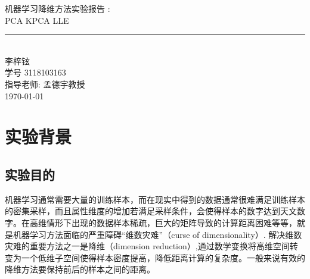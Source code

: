 \documentclass[UTF8]{ctexart}
\newcommand{\labtitle}{PCA KPCA LLE}
\newcommand{\authorname}{李梓铉}
\newcommand{\professor}{孟德宇教授}
\newcommand{\classno}{3118103163}
\begin{document}


\begin{titlepage}
\begin{center}
{\LARGE \textsc{机器学习降维方法实验报告 :} \\ \vspace{4pt}}
{\Large \textsc{\labtitle} \\ \vspace{4pt}} 
\rule[13pt]{\textwidth}{1pt} \\ \vspace{150pt}
{\large  \authorname \\ \vspace{10pt}
学号 \classno\\ \vspace{10pt}
指导老师: \professor \\ \vspace{10pt}
\today}
\end{center}
\end{titlepage}





\section{实验背景}
\subsection{实验目的}

机器学习通常需要大量的训练样本，而在现实中得到的数据通常很难满足训练样本的密集采样，而且属性维度的增加若满足采样条件，会使得样本的数字达到天文数字。在高维情形下出现的数据样本稀疏，巨大的矩阵导致的计算距离困难等等，就是机器学习方法面临的严重障碍“维数灾难”（curse of dimensionality）. 解决维数灾难的重要方法之一是降维（dimension reduction）,通过数学变换将高维空间转变为一个低维子空间使得样本密度提高，降低距离计算的复杂度。一般来说有效的降维方法要保持前后的样本之间的距离。\vspace{3mm} 
\end{document}
